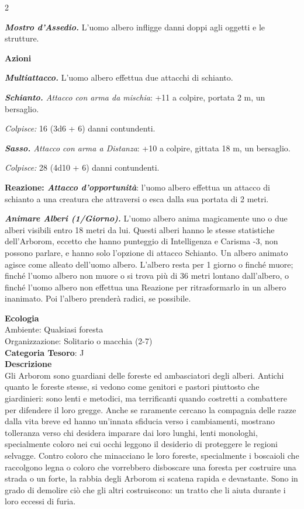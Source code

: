 \begin{multicols}{2}
{\emph{\textbf{Mostro d'Assedio.}} L'uomo albero infligge danni doppi agli oggetti e le strutture.

\textbf{Azioni}

\emph{\textbf{Multiattacco.}} L'uomo albero effettua due attacchi di schianto.

\emph{\textbf{Schianto.} Attacco con arma da mischia}: +11 a colpire, portata 2 m, un bersaglio.

\emph{Colpisce:} 16 (3d6 + 6) danni contundenti.

\emph{\textbf{Sasso.} Attacco con arma a Distanza}: +10 a colpire, gittata 18 m, un bersaglio.

\emph{Colpisce:} 28 (4d10 + 6) danni contundenti.

\textbf{Reazione: \emph{Attacco d'opportunità}}: l'uomo albero effettua un attacco di schianto a una creatura che attraversi o esca dalla sua portata di 2 metri.

\emph{\textbf{Animare Alberi (1/Giorno).}} L'uomo albero anima magicamente uno o due alberi visibili entro 18 metri da lui. Questi alberi hanno le stesse statistiche dell'Arborom, eccetto che hanno punteggio di Intelligenza e Carisma -3, non possono parlare, e hanno solo l'opzione di attacco Schianto. Un albero animato agisce come alleato dell'uomo albero. L'albero resta per 1 giorno o finché muore; finché l'uomo albero non muore o si trova più di 36 metri lontano dall'albero, o finché l'uomo albero non effettua una Reazione per ritrasformarlo in un albero inanimato. Poi l'albero prenderà radici, se possibile.

\textbf{Ecologia}\\
Ambiente: Qualsiasi foresta\\
Organizzazione: Solitario o macchia (2-7)\\
\textbf{Categoria Tesoro}: J\\
\textbf{Descrizione}\\
Gli Arborom sono guardiani delle foreste ed ambasciatori degli alberi. Antichi quanto le foreste stesse, si vedono come genitori e pastori piuttosto che giardinieri: sono lenti e metodici, ma terrificanti quando costretti a combattere per difendere il loro gregge. Anche se raramente cercano la compagnia delle razze dalla vita breve ed hanno un'innata sfiducia verso i cambiamenti, mostrano tolleranza verso chi desidera imparare dai loro lunghi, lenti monologhi, specialmente coloro nei cui occhi leggono il desiderio di proteggere le regioni selvagge. Contro coloro che minacciano le loro foreste, specialmente i boscaioli che raccolgono legna o coloro che vorrebbero disboscare una foresta per costruire una strada o un forte, la rabbia degli Arborom si scatena rapida e devastante. Sono in grado di demolire ciò che gli altri costruiscono: un tratto che li aiuta durante i loro eccessi di furia.

}
\end{multicols}
